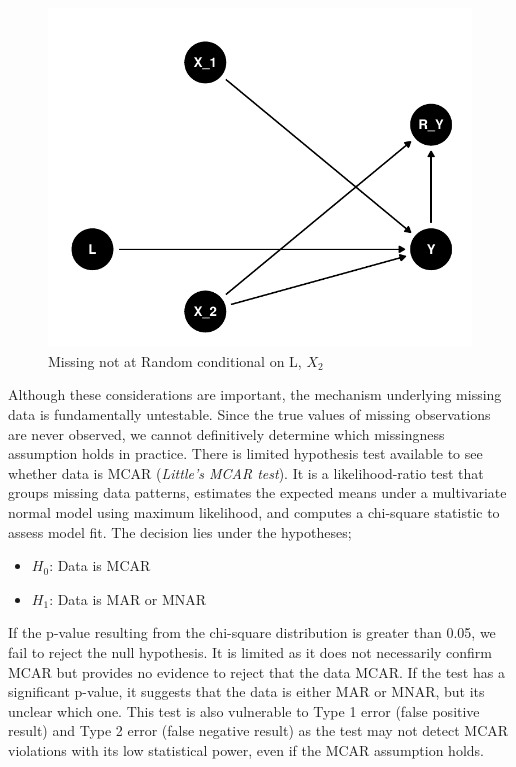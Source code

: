 \documentclass{article}
\providecommand{\tightlist}{%
  \setlength{\itemsep}{0pt}\setlength{\parskip}{0pt}}
\begin{document}
\begin{figure}

{\centering \includegraphics{Final_Report_files/figure-latex/unnamed-chunk-5-1} 

}

\caption{Missing not at Random conditional on L, \ensuremath{X_2}}\label{fig:unnamed-chunk-5}
\end{figure}

\newpage

Although these considerations are important, the mechanism underlying
missing data is fundamentally untestable. Since the true values of
missing observations are never observed, we cannot definitively
determine which missingness assumption holds in practice. There is
limited hypothesis test available to see whether data is MCAR
(\emph{Little's MCAR test}). It is a likelihood-ratio test that groups
missing data patterns, estimates the expected means under a multivariate
normal model using maximum likelihood, and computes a chi-square
statistic to assess model fit. The decision lies under the hypotheses;

\begin{itemize}
\tightlist
\item
  \(H_0\): Data is MCAR
\item
  \(H_1\): Data is MAR or MNAR
\end{itemize}

If the p-value resulting from the chi-square distribution is greater
than 0.05, we fail to reject the null hypothesis. It is limited as it
does not necessarily confirm MCAR but provides no evidence to reject
that the data MCAR. If the test has a significant p-value, it suggests
that the data is either MAR or MNAR, but its unclear which one. This
test is also vulnerable to Type 1 error (false positive result) and Type
2 error (false negative result) as the test may not detect MCAR
violations with its low statistical power, even if the MCAR assumption
holds.
\end{document}
